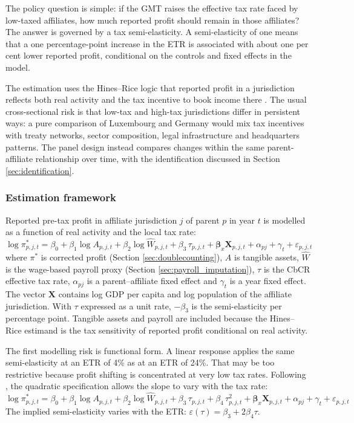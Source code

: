 \documentclass[11pt,a4paper]{article}
\begin{document}
The policy question is simple: if the GMT raises the effective tax rate faced by low-taxed affiliates, how much reported profit should remain in those affiliates? The answer is governed by a tax semi-elasticity. A semi-elasticity of one means that a one percentage-point increase in the ETR is associated with about one per cent lower reported profit, conditional on the controls and fixed effects in the model. 

The estimation uses the Hines--Rice logic that reported profit in a jurisdiction reflects both real activity and the tax incentive to book income there \citep{hines1994}. The usual cross-sectional risk is that low-tax and high-tax jurisdictions differ in persistent ways: a pure comparison of Luxembourg and Germany would mix tax incentives with treaty networks, sector composition, legal infrastructure and headquarters patterns. The panel design instead compares changes within the same parent-affiliate relationship over time, with the identification discussed in Section \ref{sec:identification}.

\subsubsection{Estimation framework}\label{sec:hines_rice}

Reported pre-tax profit in affiliate jurisdiction $j$ of parent $p$ in year $t$ is modelled as a function of real activity and the local tax rate:
\begin{equation}\label{eq:panel_linear}
\log \pi_{p,j,t}^{*} = \beta_0 + \beta_1 \log A_{p,j,t} + \beta_2 \log \hat{W}_{p,j,t} + \beta_3 \, \tau_{p,j,t} + \mathbf{\beta}_x \mathbf{X}_{p,j,t} + \alpha_{pj} + \gamma_t + \varepsilon_{p,j,t}
\end{equation}
where $\pi^{*}$ is corrected profit (Section \ref{sec:doublecounting}), $A$ is tangible assets, $\hat{W}$ is the wage-based payroll proxy (Section \ref{sec:payroll_imputation}), $\tau$ is the CbCR effective tax rate, $\alpha_{pj}$ is a parent--affiliate fixed effect and $\gamma_t$ is a year fixed effect. The vector $\mathbf{X}$ contains log GDP per capita and log population of the affiliate jurisdiction. With $\tau$ expressed as a unit rate, $-\beta_3$ is the semi-elasticity per percentage point. Tangible assets and payroll are included because the Hines--Rice estimand is the tax sensitivity of reported profit conditional on real activity.

The first modelling risk is functional form. A linear response applies the same semi-elasticity at an ETR of 4\% as at an ETR of 24\%. That may be too restrictive because profit shifting is concentrated at very low tax rates. Following \citet{dowd2017}, the quadratic specification allows the slope to vary with the tax rate:
\begin{equation}\label{eq:panel_quadratic}
\log \pi_{p,j,t}^{*} = \beta_0 + \beta_1 \log A_{p,j,t} + \beta_2 \log \hat{W}_{p,j,t} + \beta_3 \, \tau_{p,j,t} + \beta_4 \, \tau_{p,j,t}^2 + \mathbf{\beta}_x \mathbf{X}_{p,j,t} + \alpha_{pj} + \gamma_t + \varepsilon_{p,j,t}
\end{equation}
The implied semi-elasticity varies with the ETR: $\varepsilon(\tau) = \beta_3 + 2\beta_4 \tau$.
\end{document}
